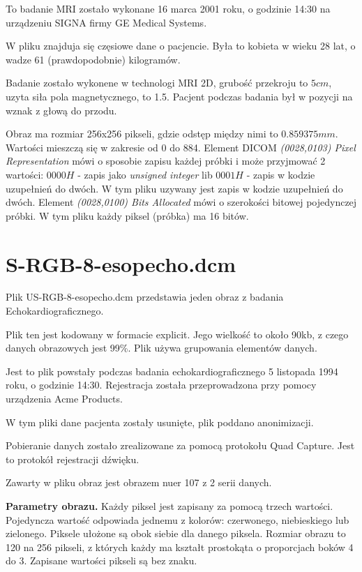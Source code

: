 \documentclass[11pt,a4paper]{article}
\begin{document}
To badanie MRI zostało wykonane 16 marca 2001 roku, o godzinie 14:30 na
urządzeniu SIGNA firmy GE Medical Systems.

W pliku znajduja się częsiowe dane o pacjencie. Była to kobieta w wieku 28 lat,
o wadze 61 (prawdopodobnie) kilogramów.

Badanie zostało wykonene w technologi MRI 2D, grubość przekroju to $5 cm$,
uzyta siła pola magnetycznego, to 1.5. Pacjent podczas badania był w pozycji na
wznak z głową do przodu.

Obraz ma rozmiar 256x256 pikseli, gdzie odstęp między nimi to $0.859375 mm$.
Wartości mieszczą się w zakresie od 0 do 884. Element DICOM \emph{(0028,0103) Pixel
Representation} mówi o sposobie zapisu każdej próbki i może przyjmować 2
wartości: $0000H$ - zapis jako \emph{unsigned integer} lib $0001H$ - zapis w
kodzie uzupełnień do dwóch. W tym pliku uzywany jest zapis w kodzie uzupełnień
do dwóch. Element \emph{(0028,0100) Bits Allocated} mówi o szerokości bitowej
pojedynczej próbki. W tym pliku każdy piksel (próbka) ma 16 bitów.


\section{S-RGB-8-esopecho.dcm}
Plik US-RGB-8-esopecho.dcm przedstawia jeden obraz z badania Echokardiograficznego.

Plik ten jest kodowany w formacie explicit. Jego wielkość to około 90kb, z
czego danych obrazowych jest 99\%. Plik używa grupowania elementów danych.

Jest to plik powstały podczas badania echokardiograficznego 5 listopada 1994 roku, o godzinie 14:30. Rejestracja została przeprowadzona przy pomocy urządzenia Acme Products.

W tym pliki dane pacjenta zostały usunięte, plik poddano anonimizacji.

Pobieranie danych zostało zrealizowane za pomocą protokołu Quad Capture. Jest to protokół rejestracji dźwięku.

Zawarty w pliku obraz jest obrazem nuer 107 z 2 serii danych.

\textbf{Parametry obrazu.} Każdy piksel jest zapisany za pomocą trzech wartości. Pojedyncza wartość odpowiada jednemu z kolorów: czerwonego, niebieskiego lub zielonego. Piksele ułożone są obok siebie dla danego piksela. Rozmiar obrazu to 120 na 256 pikseli, z których każdy ma kształt prostokąta o proporcjach boków 4 do 3. Zapisane wartości pikseli są bez znaku.
\end{document}
